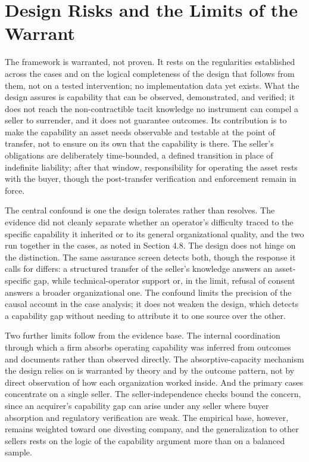 \documentclass[twoside,fontset=lmodern]{mitthesis}
\begin{document}
\hypertarget{design-risks-and-the-limits-of-the-warrant}{%
\section{Design Risks and the Limits of the
Warrant}\label{design-risks-and-the-limits-of-the-warrant}}

The framework is warranted, not proven. It rests on the regularities
established across the cases and on the logical completeness of the
design that follows from them, not on a tested intervention; no
implementation data yet exists. What the design assures is capability
that can be observed, demonstrated, and verified; it does not reach the
non-contractible tacit knowledge no instrument can compel a seller to
surrender, and it does not guarantee outcomes. Its contribution is to
make the capability an asset needs observable and testable at the point
of transfer, not to ensure on its own that the capability is there. The
seller's obligations are deliberately time-bounded, a defined transition
in place of indefinite liability; after that window, responsibility for
operating the asset rests with the buyer, though the post-transfer
verification and enforcement remain in force.

The central confound is one the design tolerates rather than resolves.
The evidence did not cleanly separate whether an operator's difficulty
traced to the specific capability it inherited or to its general
organizational quality, and the two run together in the cases, as noted
in Section 4.8. The design does not hinge on the distinction. The same
assurance screen detects both, though the response it calls for differs:
a structured transfer of the seller's knowledge answers an
asset-specific gap, while technical-operator support or, in the limit,
refusal of consent answers a broader organizational one. The confound
limits the precision of the causal account in the case analysis; it does
not weaken the design, which detects a capability gap without needing to
attribute it to one source over the other.

Two further limits follow from the evidence base. The internal
coordination through which a firm absorbs operating capability was
inferred from outcomes and documents rather than observed directly. The
absorptive-capacity mechanism the design relies on is warranted by
theory and by the outcome pattern, not by direct observation of how each
organization worked inside. And the primary cases concentrate on a
single seller. The seller-independence checks bound the concern, since
an acquirer's capability gap can arise under any seller where buyer
absorption and regulatory verification are weak. The empirical base,
however, remains weighted toward one divesting company, and the
generalization to other sellers rests on the logic of the capability
argument more than on a balanced sample.
\end{document}
